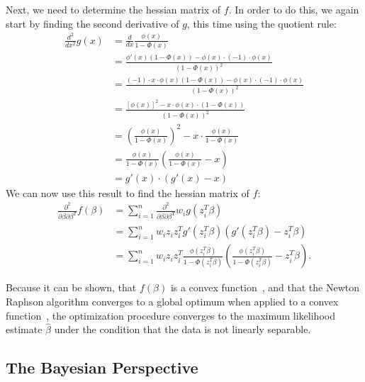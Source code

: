 \noindent Next, we need to determine the hessian matrix of $f$. In order to do this,
we again start by finding the second derivative of $g$, this time
using the quotient rule:
\begin{equation}
    \begin{split}
        \frac{d^2}{dx^2}g(x)
        & = \frac{d}{dx} \frac{\phi(x)}{1 - \Phi(x)} \\
        & = \frac{\phi'(x)(1 - \Phi(x)) - \phi(x) \cdot (-1) \cdot \phi(x)}
        {(1 - \Phi(x))^2} \\
        & = \frac{(-1) \cdot x \cdot \phi(x)(1 - \Phi(x)) - \phi(x) \cdot (-1) \cdot \phi(x)}
        {(1 - \Phi(x))^2} \\
        & = \frac{[\phi(x)]^2 - x \cdot \phi(x) \cdot (1 - \Phi(x))}{(1 - \Phi(x))^2} \\
        & = \left(\frac{\phi(x)}{1 - \Phi(x)}\right)^2 - x \cdot \frac{\phi(x)}{1 - \Phi(x)} \\
        & = \frac{\phi(x)}{1 - \Phi(x)} \left( \frac{\phi(x)}{1 - \Phi(x)} - x \right)  \\
        & = g'(x) \cdot (g'(x) - x)
    \end{split}
\end{equation}
We can now use this result to find the hessian matrix of $f$:
\begin{equation}
    \begin{split}
        \frac{\partial^2}{\partial \beta \partial \beta^T} f(\beta)
        & = \sum_{i=1}^n
        \frac{\partial^2}{\partial \beta \partial \beta^T} w_i g(z_i^T \beta)\\
        & = \sum_{i=1}^n w_i z_i z_i^T g'(z_i^T \beta)(g'(z_i^T \beta) - z_i^T \beta)\\
        & = \sum_{i=1}^n w_i z_i z_i^T
        \frac{\phi(z_i^T \beta)}{1 - \Phi(z_i^T \beta)} \left( \frac{\phi(z_i^T \beta)}{1 - \Phi(z_i^T \beta)} - z_i^T \beta \right).
    \end{split}
\end{equation}

\noindent Because it can be shown, that
$f(\beta)$ is a convex function~\cite{wedderburn},
and that the Newton Raphson algorithm converges to
a global optimum when applied to a convex
function~\cite{numerical-optimization},
the optimization procedure converges to the
maximum likelihood estimate $\hat{\beta}$ under the condition that
the data is not linearly separable.

\subsection{The Bayesian Perspective}

